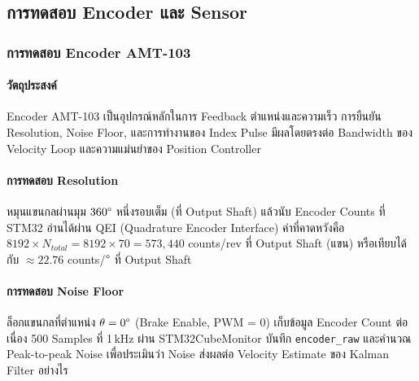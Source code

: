 
\subsection{การทดสอบ Encoder และ Sensor}
\label{subsec:sensor_test}

\subsubsection{การทดสอบ Encoder AMT-103}
\label{subsubsec:encoder_test}

\paragraph{วัตถุประสงค์}
Encoder AMT-103 เป็นอุปกรณ์หลักในการ Feedback ตำแหน่งและความเร็ว
การยืนยัน Resolution, Noise Floor, และการทำงานของ Index Pulse
มีผลโดยตรงต่อ Bandwidth ของ Velocity Loop และความแม่นยำของ Position Controller

\paragraph{การทดสอบ Resolution}
หมุนแขนกลผ่านมุม $360\degree$ หนึ่งรอบเต็ม (ที่ Output Shaft)
แล้วนับ Encoder Counts ที่ STM32 อ่านได้ผ่าน QEI (Quadrature Encoder Interface)
ค่าที่คาดหวังคือ $8192 \times N_{total} = 8192 \times 70 = 573{,}440$ counts/rev
ที่ Output Shaft (แขน)
หรือเทียบได้กับ $\approx 22.76$ counts/$\degree$ ที่ Output Shaft

\paragraph{การทดสอบ Noise Floor}
ล็อกแขนกลที่ตำแหน่ง $\theta = 0\degree$ (Brake Enable, PWM = 0)
เก็บข้อมูล Encoder Count ต่อเนื่อง 500 Samples ที่ 1\,kHz
ผ่าน STM32CubeMonitor บันทึก \texttt{encoder\_raw}
และคำนวณ Peak-to-peak Noise เพื่อประเมินว่า Noise
ส่งผลต่อ Velocity Estimate ของ Kalman Filter อย่างไร


